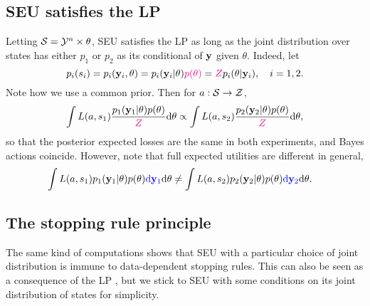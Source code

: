 \subsection{SEU satisfies the LP}
Letting $\mathcal{S} = \mathcal{Y}^n\times\theta$, SEU satisfies the LP as long as the joint distribution over states has either $p_1$ or $p_2$ as its conditional of $\mathbf{y}$ given $\theta$.
Indeed, let
$$
p_i(s_i) = p_i(\mathbf{y}_i,\theta) = p_i(\mathbf{y}_i\vert\theta)\textcolor{magenta}{p(\theta)} = \textcolor{magenta}{Z} p_i(\theta\vert \mathbf{y}_i), \quad i=1,2.
$$
Note how we use a common prior. 
Then for $a:\mathcal{S}\rightarrow\mathcal{Z}$,
  $$ 
  \int L(a,s_1) \frac{p_1(\mathbf{y}_1\vert\theta)p(\theta)}{\textcolor{magenta}{Z}} \mathrm{d}\theta \propto \int L(a,s_2) \frac{p_2(\mathbf{y}_2\vert\theta)p(\theta)}{\textcolor{magenta}{Z}} \mathrm{d}\theta, 
  $$
  so that the posterior expected losses are the same in both experiments, and Bayes actions coincide.
  However, note that full expected utilities are different in general, 
  \begin{align*}
    \int L(a,s_1) p_1(\mathbf{y}_1\vert\theta)p(\theta) \textcolor{blue}{\mathrm{d} \mathbf{y}_1}\mathrm{d}\theta
    &\neq \int L(a,s_2) p_2(\mathbf{y}_2\vert\theta)p(\theta) \textcolor{blue}{\mathrm{d} \mathbf{y}_2}\mathrm{d}\theta.
  \end{align*}

\subsection{The stopping rule principle}
The same kind of computations shows that SEU with a particular choice of joint distribution is immune to data-dependent stopping rules. 
This can also be seen as a consequence of the LP \citep{BeWo88}, but we stick to SEU with some conditions on its joint distribution of states for simplicity.

